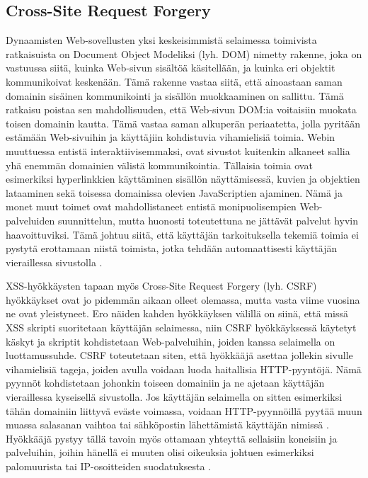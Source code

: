 \subsection{Cross-Site Request Forgery}

Dynaamisten Web-sovellusten yksi keskeisimmistä selaimessa toimivista ratkaisuista on Document Object Modeliksi (lyh. DOM) nimetty rakenne, joka on vastuussa siitä,
kuinka Web-sivun sisältöä käsitellään, ja kuinka eri objektit kommunikoivat keskenään. Tämä rakenne vastaa siitä, että ainoastaan saman domainin 
sisäinen kommunikointi ja sisällön muokkaaminen on sallittu. Tämä ratkaisu poistaa sen mahdollisuuden, että Web-sivun DOM:ia voitaisiin muokata toisen
domainin kautta. Tämä vastaa saman alkuperän periaatetta, jolla pyritään estämään Web-sivuihin ja käyttäjiin kohdistuvia vihamielisiä toimia.
Webin muuttuessa entistä interaktiivisemmaksi, ovat sivustot kuitenkin alkaneet sallia yhä enemmän domainien välistä kommunikointia. Tällaisia 
toimia ovat esimerkiksi hyperlinkkien käyttäminen sisällön näyttämisessä, kuvien ja objektien lataaminen sekä toisessa domainissa olevien 
JavaScriptien ajaminen. Nämä ja monet muut toimet ovat mahdollistaneet entistä monipuolisempien Web-\-palveluiden suunnittelun, mutta huonosti toteutettuna 
ne jättävät palvelut hyvin haavoittuviksi. Tämä johtuu siitä, että käyttäjän tarkoituksella tekemiä toimia ei pystytä erottamaan niistä toimista, jotka tehdään 
automaattisesti käyttäjän vieraillessa sivustolla \cite{WEB2}.

XSS-hyökkäysten tapaan myös Cross-Site Request Forgery (lyh. CSRF) hyökkäykset ovat jo pidemmän aikaan olleet olemassa, mutta vasta viime vuosina ne
ovat yleistyneet. Ero näiden kahden hyökkäyksen välillä on siinä, että missä XSS skripti suoritetaan käyttäjän selaimessa, niin CSRF hyökkäyksessä käytetyt
käskyt ja skriptit kohdistetaan Web-palveluihin, joiden kanssa selaimella on luottamussuhde. CSRF toteutetaan siten, että hyökkääjä asettaa jollekin sivulle
vihamielisiä tageja, joiden avulla voidaan luoda haitallisia HTTP-pyyntöjä. Nämä pyynnöt kohdistetaan johonkin toiseen domainiin ja ne ajetaan käyttäjän 
vieraillessa kyseisellä sivustolla. Jos käyttäjän selaimella on sitten esimerkiksi tähän domainiin liittyvä eväste voimassa, voidaan HTTP-pyynnöillä pyytää muun muassa
salasanan vaihtoa tai sähköpostin lähettämistä käyttäjän nimissä \cite{WEB2b}. Hyökkääjä pystyy tällä tavoin myös ottamaan yhteyttä sellaisiin koneisiin ja palveluihin,
joihin hänellä ei muuten olisi oikeuksia johtuen esimerkiksi palomuurista tai IP-osoitteiden suodatuksesta \cite{CSRF}.

